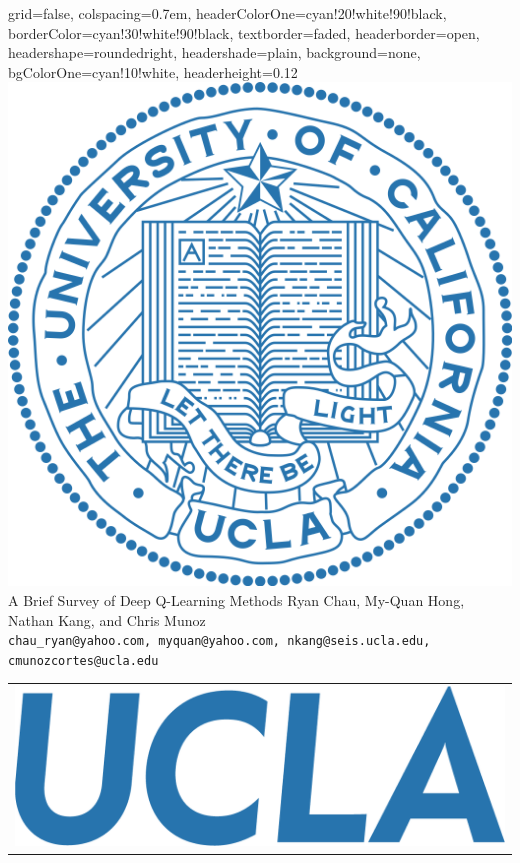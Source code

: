 \documentclass[landscape,a0paper,fontscale=0.292]{baposter}
\begin{document}
\begin{poster}{
    grid=false,
    colspacing=0.7em,
    headerColorOne=cyan!20!white!90!black,
    borderColor=cyan!30!white!90!black,
    textborder=faded,
    headerborder=open,
    headershape=roundedright,
    headershade=plain,
    background=none,
    bgColorOne=cyan!10!white,
    headerheight=0.12\textheight
}
    {
         \includegraphics[height=0.1\textheight]{ucla_campus_seal}
    }
    {\sc\Huge A Brief Survey of Deep Q-Learning Methods}
    {Ryan Chau, My-Quan Hong, Nathan Kang, and Chris Munoz\\[0.5em]
    {\texttt{chau\_ryan@yahoo.com, myquan@yahoo.com, nkang@seis.ucla.edu,
    cmunozcortes@ucla.edu}}}
    {
     \begin{tabular}{r}
       \includegraphics[height=0.05\textheight]{logo_UCLA_blue}
     \end{tabular}
    }


\end{poster}
\end{document}
